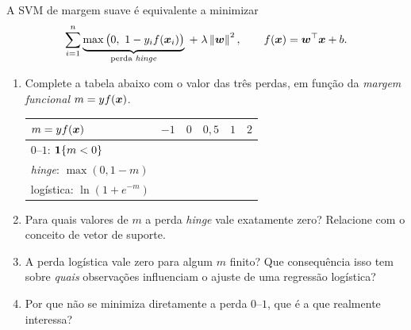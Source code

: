 \documentclass[11pt,a4paper]{article}
\begin{document}
\begin{exercicio}
A SVM de margem suave é equivalente a minimizar
\[
  \sum_{i=1}^{n} \underbrace{\max\big(0,\ 1 - y_i f(\bm{x}_i)\big)}_{\text{perda \emph{hinge}}}
   \;+\; \lambda\left\lVert \bm w \right\rVert^2,
  \qquad f(\bm{x})=\bm w^\top\bm{x}+b .
\]
\begin{enumerate}[label=(\alph*),leftmargin=1.1cm]
  \item Complete a tabela abaixo com o valor das três perdas, em função da
        \emph{margem funcional} $m = y f(\bm{x})$.
        \begin{center}\small
        \renewcommand{\arraystretch}{1.3}
        \begin{tabular}{@{}lccccc@{}}
        \toprule
        $m=yf(\bm{x})$ & $-1$ & $0$ & $0{,}5$ & $1$ & $2$ \\
        \midrule
        $0$--$1$: $\mathbf{1}\!\left\{m<0\right\}$          & & & & & \\
        \emph{hinge}: $\max(0,1-m)$  & & & & & \\
        logística: $\ln(1+e^{-m})$   & & & & & \\
        \bottomrule
        \end{tabular}
        \end{center}
  \item Para quais valores de $m$ a perda \emph{hinge} vale exatamente zero?
        Relacione com o conceito de vetor de suporte.
  \item A perda logística vale zero para algum $m$ finito? Que consequência isso
        tem sobre \emph{quais} observações influenciam o ajuste de uma regressão
        logística?
  \item Por que não se minimiza diretamente a perda $0$--$1$, que é a que
        realmente interessa?
\end{enumerate}
\end{exercicio}
\end{document}
